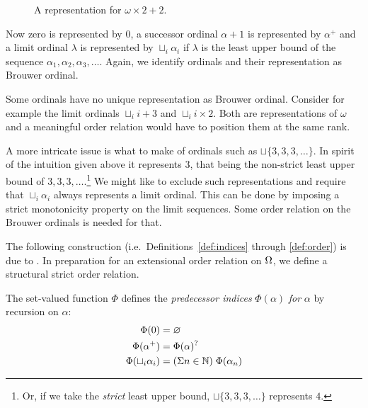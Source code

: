 \begin{figure}
\begin{center}
\begin{tikzpicture}

\end{tikzpicture}
\end{center}
\caption{A representation for $\omega \times 2 + 2$.}\label{fig:brouwer}
\end{figure}

Now zero is represented by $0$, a successor ordinal $\alpha +1$ is represented
by $\alpha^+$ and a limit ordinal $\lambda$ is represented by $\sqcup_i
\alpha_i$ if $\lambda$ is the least upper bound of the sequence $\alpha_1,
\alpha_2, \alpha_3, \ldots$. Again, we identify ordinals and their
representation as Brouwer ordinal.

Some ordinals have no unique representation as Brouwer ordinal. Consider for
example the limit ordinals $\sqcup_i i + 3$ and $\sqcup_i i \times 2$. Both
are representations of $\omega$ and a meaningful order relation would
have to position them at the same rank.

A more intricate issue is what to make of ordinals such as $\sqcup \{
3, 3, 3, \ldots \}$. In spirit of the intuition given above it
represents $3$, that being the non-strict least upper bound of $3, 3,
3, \ldots$.\footnote{Or, if we take the \emph{strict} least upper bound, $\sqcup \{
3, 3, 3, \ldots \}$ represents $4$.}
We might like to exclude such representations and require that
$\sqcup_i \alpha_i$ always represents a limit ordinal. This can be
done by imposing a strict monotonicity property on the limit
sequences. Some order relation on the Brouwer ordinals is needed for
that.

The following construction (i.e.\ Definitions~\ref{def:indices}
through \ref{def:order}) is due to \citet{hancock-08}. In preparation
for an extensional order relation on $\Ord$, we define a structural
strict order relation.

\begin{definition}\label{def:indices}%
The set-valued function $\Phi$ defines the \emph{predecessor indices}
$\Phi(\alpha)$ \emph{for} $\alpha$ by recursion on $\alpha$:
\begin{align*}
  \Phi(0)                 &= \nothing \\
  \Phi(\alpha^+)          &= \Phi(\alpha)^? \\
  \Phi(\sqcup_i \alpha_i) &= (\Sigma n \in \mathbb{N}) \; \Phi(\alpha_n)
\end{align*}
\end{definition}

